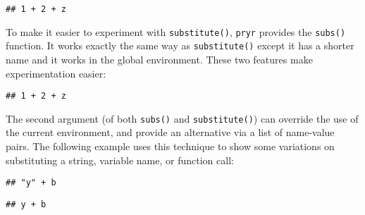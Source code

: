 \begin{verbatim}
## 1 + 2 + z
\end{verbatim}

To make it easier to experiment with \texttt{substitute()},
\texttt{pryr} provides the \texttt{subs()} function. It works exactly
the same way as \texttt{substitute()} except it has a shorter name and
it works in the global environment. These two features make
experimentation easier:

\begin{Shaded}
\begin{Highlighting}[]
\StringTok{ }
\StringTok{ }
\OperatorTok{+}\StringTok{ }\OperatorTok{+}\StringTok{ }
\end{Highlighting}
\end{Shaded}

\begin{verbatim}
## 1 + 2 + z
\end{verbatim}

The second argument (of both \texttt{subs()} and \texttt{substitute()})
can override the use of the current environment, and provide an
alternative via a list of name-value pairs. The following example uses
this technique to show some variations on substituting a string,
variable name, or function call:

\begin{Shaded}
\begin{Highlighting}[]
\OperatorTok{+}\StringTok{ }\NormalTok{(} \NormalTok{))}
\end{Highlighting}
\end{Shaded}

\begin{verbatim}
## "y" + b
\end{verbatim}

\begin{Shaded}
\begin{Highlighting}[]
\OperatorTok{+}\StringTok{ }\NormalTok{(} 
\end{Highlighting}
\end{Shaded}

\begin{verbatim}
## y + b
\end{verbatim}

